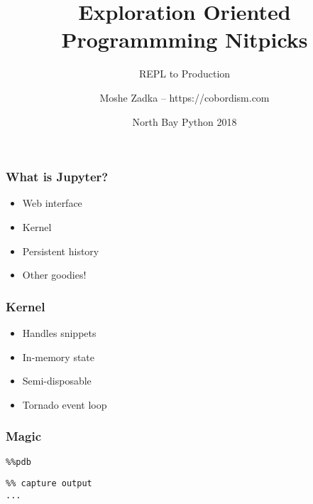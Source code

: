 \usepackage[utf8]{inputenc}
\usepackage{listings}
\usepackage{textcomp}

\title{Exploration Oriented Programmming Nitpicks}
\subtitle{REPL to Production}
\author{Moshe Zadka -- https://cobordism.com}
\date{North Bay Python 2018}
 

 
\begin{titlepage}
\maketitle
\end{titlepage}

\frame{\titlepage}

\begin{frame}
\frametitle{What is Jupyter?}

\begin{itemize}
\item Web interface
\item Kernel
\item Persistent history
\item Other goodies!
\end{itemize}

\end{frame}

\begin{frame}
\frametitle{Kernel}

\begin{itemize}
\item Handles snippets
\item In-memory state
\item Semi-disposable
\item Tornado event loop
\end{itemize}

\end{frame}

\begin{frame}[fragile]
\frametitle{Magic}

\begin{lstlisting}
%%pdb
\end{lstlisting}

\begin{lstlisting}
%% capture output
...
\end{lstlisting}

\end{frame}

